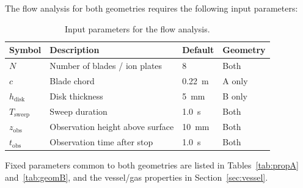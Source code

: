 \documentclass[11pt,a4paper]{article}
\begin{document}
The flow analysis for both geometries requires the following input
parameters:

\begin{table}[H]
\centering
\caption{Input parameters for the flow analysis.}
\label{tab:params_analysis}
\begin{tabular}{llll}
\toprule
Symbol & Description & Default & Geometry \\
\midrule
$N$  & Number of blades / ion plates & 8 & Both \\
$c$  & Blade chord & \SI{0.22}{m} & A only \\
$h_\mathrm{disk}$ & Disk thickness & \SI{5}{mm} & B only \\
$T_\mathrm{sweep}$ & Sweep duration & \SI{1.0}{s} & Both \\
$z_\mathrm{obs}$ & Observation height above surface & \SI{10}{mm} & Both \\
$t_\mathrm{obs}$ & Observation time after stop & \SI{1.0}{s} & Both \\
\bottomrule
\end{tabular}
\end{table}

Fixed parameters common to both geometries are listed in
Tables~\ref{tab:propA} and~\ref{tab:geomB}, and the vessel/gas
properties in Section~\ref{sec:vessel}.
\end{document}
